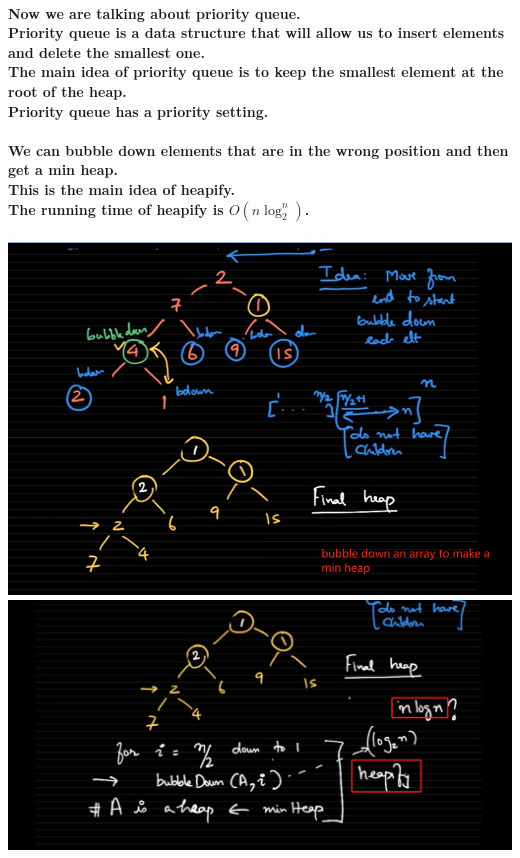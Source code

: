 \documentclass{article}
\begin{document}
\paragraph{Now we are talking about priority queue.\\
Priority queue is a data structure that will allow us to insert elements and delete the smallest one.\\
The main idea of priority queue is to keep the smallest element at the root of the heap.\\
Priority queue has a priority setting.\\}

\paragraph{We can bubble down elements that are in the wrong position and then get a min heap.\\
This is the main idea of heapify.\\
The running time of heapify is $O(n\log_2^n)$.\\}


\includegraphics[width=\textwidth]{array2minheap.png}
\includegraphics[width=\textwidth]{heapify.png}
\end{document}
